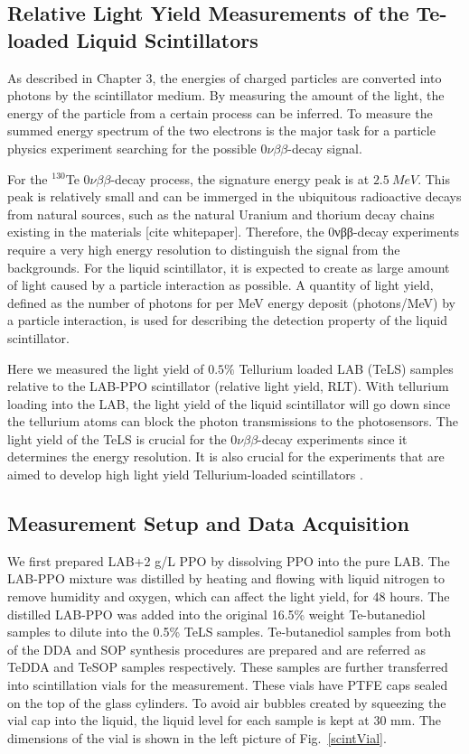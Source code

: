 \subsection{Relative Light Yield Measurements of the Te-loaded Liquid Scintillators}

As described in Chapter 3, the energies of charged particles are converted into photons by the scintillator medium. By measuring the amount of the light, the energy of the particle from a certain process can be inferred. To measure the summed energy spectrum of the two electrons is the major task for a particle physics experiment searching for the possible $0\nu\beta\beta$-decay signal.

For the $^{130}${Te} $0\nu\beta\beta$-decay process, the signature energy peak is at $2.5~MeV$\cite{whitepaper}.  This peak is relatively small and can be immerged in the ubiquitous radioactive decays from natural sources, such as the natural Uranium and thorium decay chains existing in the materials [cite whitepaper]. Therefore, the 0νββ-decay experiments require a very high energy resolution to distinguish the signal from the backgrounds. For the liquid scintillator, it is expected to create as large amount of light caused by a particle interaction as possible. A quantity of light yield, defined as the number of photons for per MeV energy deposit (photons/MeV) by a particle interaction, is used for describing the detection property of the liquid scintillator.

Here we measured the light yield of $0.5\%$ Tellurium loaded LAB (TeLS) samples relative to the LAB-PPO scintillator (relative light yield, RLT). With tellurium loading into the LAB, the light yield of the liquid scintillator will go down since the tellurium atoms can block the photon transmissions to the photosensors.  The light yield of the TeLS is crucial for the $0\nu\beta\beta$-decay experiments since it determines the energy resolution. It is also crucial for the experiments that are aimed to develop high light yield Tellurium-loaded scintillators \cite{biller2017new}.

\subsection{Measurement Setup and Data Acquisition}

We first prepared LAB+2 g/L PPO by dissolving PPO into the pure LAB. The LAB-PPO mixture was distilled by heating and flowing with liquid nitrogen to remove humidity and oxygen, which can affect the light yield, for 48 hours. The distilled LAB-PPO was added into the original 16.5\% weight Te-butanediol samples to dilute into the 0.5\% TeLS samples.  Te-butanediol samples from both of the DDA and SOP synthesis procedures are prepared and are referred as TeDDA and TeSOP samples respectively. These samples are further transferred into scintillation vials for the measurement. These vials have PTFE caps sealed on the top of the glass cylinders. To avoid air bubbles created by squeezing the vial cap into the liquid, the liquid level for each sample is kept at 30 mm. The dimensions of the vial is shown in the left picture of Fig.~\ref{scintVial}.

